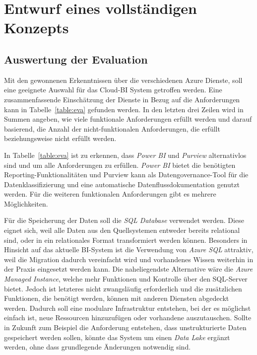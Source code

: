 \section{Entwurf eines vollständigen Konzepts} \label{sec:entwurfBIArchitektur}

\subsection{Auswertung der Evaluation} \label{sec:konzeption:evaAuswertung}
Mit den gewonnenen Erkenntnissen über die verschiedenen Azure Dienste, soll eine geeignete Auswahl für das Cloud-BI System getroffen werden. Eine zusammenfassende Einschätzung der Dienste in Bezug auf die Anforderungen kann in Tabelle~\ref{table:eva} gefunden werden. In den letzten drei Zeilen wird in Summen angeben, wie viele funktionale Anforderungen erfüllt werden und darauf basierend, die Anzahl der nicht-funktionalen Anforderungen, die erfüllt beziehungsweise nicht erfüllt werden.


In Tabelle~\ref{table:eva} ist zu erkennen, dass \textit{Power BI} und \textit{Purview} alternativlos sind und um alle Anforderungen zu erfüllen. \textit{Power BI} bietet die benötigten Reporting-Funktionalitäten und Purview kann als Datengovernance-Tool für die Datenklassifizierung und eine automatische Datenflussdokumentation genutzt werden. Für die weiteren funktionalen Anforderungen gibt es mehrere Möglichkeiten. 

Für die Speicherung der Daten soll die \textit{SQL Database} verwendet werden. Diese eignet sich, weil alle Daten aus den Quellsystemen entweder bereits relational sind, oder in ein relationales Format transformiert werden können. Besonders in Hinsicht auf das aktuelle BI-System ist die Verwendung von \textit{Azure SQL} attraktiv, weil die Migration dadurch vereinfacht wird und vorhandenes Wissen weiterhin in der Praxis eingesetzt werden kann. Die naheliegendste Alternative wäre die \textit{Azure Managed Instance}, welche mehr Funktionen und Kontrolle über den SQL-Server bietet. Jedoch ist letzteres nicht zwangsläufig erforderlich und die zusätzlichen Funktionen, die benötigt werden, können mit anderen Diensten abgedeckt werden. Dadurch soll eine modulare Infrastruktur entstehen, bei der es möglichst einfach ist, neue Ressourcen hinzuzufügen oder vorhandene auszutauschen. Sollte in Zukunft zum Beispiel die Anforderung entstehen, dass unstrukturierte Daten gespeichert werden sollen, könnte das System um einen \textit{Data Lake} ergänzt werden, ohne dass grundlegende Änderungen notwendig sind.

